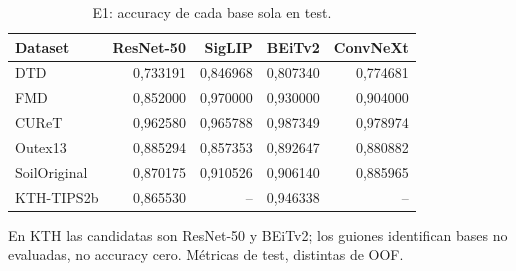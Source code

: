 \begin{table}[!htbp]\centering
\fontsize{8}{10}\selectfont\setlength{\tabcolsep}{4pt}
\caption{E1: accuracy de cada base sola en test.}\label{tab:e1-bases-test}
\begin{tabular}{@{}lrrrr@{}}\toprule
Dataset & ResNet-50 & SigLIP & BEiTv2 & ConvNeXt\\\midrule
DTD & 0,733191 & 0,846968 & 0,807340 & 0,774681\\
FMD & 0,852000 & 0,970000 & 0,930000 & 0,904000\\
CUReT & 0,962580 & 0,965788 & 0,987349 & 0,978974\\
Outex13 & 0,885294 & 0,857353 & 0,892647 & 0,880882\\
SoilOriginal & 0,870175 & 0,910526 & 0,906140 & 0,885965\\
KTH-TIPS2b & 0,865530 & -- & 0,946338 & --\\
\bottomrule\end{tabular}
\par\smallskip\begin{minipage}{0.98\textwidth}\footnotesize En KTH las candidatas son ResNet-50 y BEiTv2; los guiones identifican bases no evaluadas, no accuracy cero. Métricas de test, distintas de OOF.\end{minipage}
\end{table}
